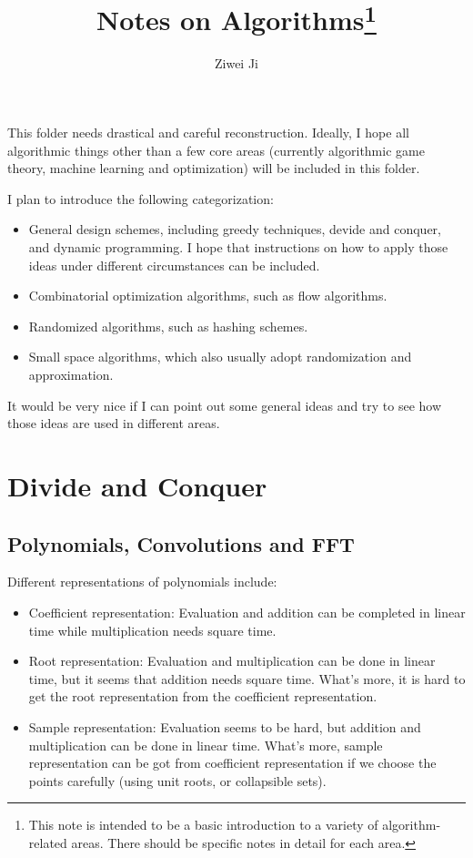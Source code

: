 \documentclass[openany]{book}
\author{Ziwei Ji}
\title{Notes on Algorithms\footnote{This note is intended to be a basic introduction to a variety of algorithm-related areas. There should be specific notes in detail for each area.}}
\begin{document}
\newcommand{\tbf}[1]{\textbf{#1}}
\newcommand{\bs}[1]{\boldsymbol{#1}}
\newcommand{\mr}[1]{\mathrm{#1}}
\newcommand{\mc}[1]{\mathcal{#1}}
\newcommand{\mbb}[1]{\mathbb{#1}}
\newcommand{\mbf}[1]{\mathbf{#1}}

\maketitle

This folder needs drastical and careful reconstruction. Ideally, I hope all algorithmic things other than a few core areas (currently algorithmic game theory, machine learning and optimization) will be included in this folder.

I plan to introduce the following categorization:
\begin{itemize}
    \item General design schemes, including greedy techniques, devide and conquer, and dynamic programming. I hope that instructions on how to apply those ideas under different circumstances can be included.
    \item Combinatorial optimization algorithms, such as flow algorithms.
    \item Randomized algorithms, such as hashing schemes.
    \item Small space algorithms, which also usually adopt randomization and approximation.
\end{itemize}
It would be very nice if I can point out some general ideas and try to see how those ideas are used in different areas.

\chapter{Divide and Conquer}

\section{Polynomials, Convolutions and FFT}
Different representations of polynomials include:
\begin{itemize}
\item Coefficient representation: Evaluation and addition can be completed in linear time while multiplication needs square time.
\item Root representation: Evaluation and multiplication can be done in linear time, but it seems that addition needs square time. What's more, it is hard to get the root representation from the coefficient representation.
\item Sample representation: Evaluation seems to be hard, but addition and multiplication can be done in linear time. What's more, sample representation can be got from coefficient representation if we choose the points carefully (using unit roots, or collapsible sets).
\end{itemize}
\end{document}
